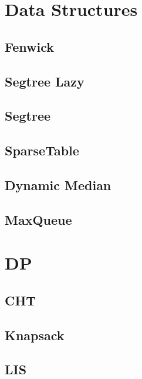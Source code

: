 \section{Data Structures}
\subsection{Fenwick}
\raggedbottom
\hrulefill
\subsection{Segtree Lazy}
\raggedbottom
\hrulefill
\subsection{Segtree}
\raggedbottom
\hrulefill
\subsection{SparseTable}
\raggedbottom
\hrulefill
\subsection{Dynamic Median}
\raggedbottom
\hrulefill
\subsection{MaxQueue}
\raggedbottom
\hrulefill

\section{DP}
\subsection{CHT}
\raggedbottom
\hrulefill
\subsection{Knapsack}
\raggedbottom
\hrulefill
\subsection{LIS}
\raggedbottom
\hrulefill

